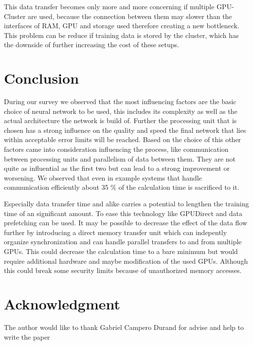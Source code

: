 \documentclass[conference]{IEEEtran}
\begin{document}
This data transfer becomes only more and more concerning if multiple GPU-Cluster are used, because the connection between them may slower than the interfaces of RAM, GPU and storage used therefore creating a new bottleneck. This problem can be reduce if training data is stored by the cluster, which has the downside of further increasing the cost of these setups.




\section{Conclusion}
During our survey we observed that the most influencing factors are the basic choice of neural network to be used, this includes its complexity as well as the actual architecture the network is build of. Further the processing unit that is chosen has a strong influence on the quality and speed the final network that lies within acceptable error limits will be reached. Based on the choice of this other factors came into consideration influencing the process, like communication between processing units and parallelism of data between them. They are not quite as influential as the first two but can lead to a strong improvement or worsening. We observed that even in example systems that handle communication efficiently about 35 \% of the calculation time is sacrificed to it.

Especially data transfer time and alike carries a potential to lengthen the training time of an significant amount. To ease this technology like GPUDirect\cite{nvidiagpudirect2017} and data prefetching\cite{yang2010gpgpu} can be used. It may be possible to decrease the effect of the data flow further by introducing a direct memory transfer unit which can indepently organize synchronization and can handle parallel transfers to and from multiple GPUs. This could decrease the calculation time to a bare minimum but would require additional hardware and maybe modification of the used GPUs. Although this could break some security limits because of unauthorized memory accesses. 

\section*{Acknowledgment}
The author would like to thank Gabriel Campero Durand for advise and help to write the paper







\end{document}
